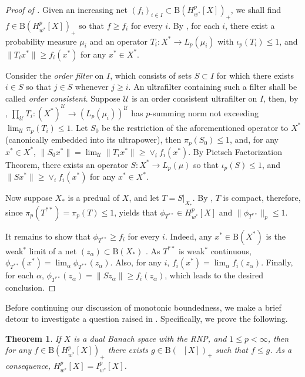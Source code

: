 \documentclass{amsart}
\theoremstyle{plain}
\newtheorem{theorem}{Theorem}[section]
\theoremstyle{definition}
\numberwithin{equation}{section}
\newcommand{\N}{\mathbb{N}}
\newcommand{\ball}{\mathrm{B}}
\DeclareMathOperator{\FBLp}{FBL^{\mathit{(p)}}}
\newcommand{\Hp}{H_{w^*}^{p}}
\newcommand{\nip}{I_{w^*}^{p}}
\begin{document}
\begin{proof}[Proof of ]
Given an increasing net $(f_i)_{i \in I} \subset \ball(\Hp[X])_+$, we shall find $f \in \ball(\Hp[X])_+$ so that $f \geq f_i$ for every $i$.
By , for each $i$, there exist a probability measure $\mu_i$ and an operator $T_i : X^* \to L_p(\mu_i)$ with $\iota_p(T_i) \leq 1$, and $\|T_i x^*\| \geq f_i(x^*)$ for any $x^* \in X^*$.

Consider the \emph{order filter} on $I$, which consists of sets $S \subset I$ for which there exists $i \in S$ so that $j \in S$ whenever $j \geq i$. An ultrafilter containing such a filter shall be called \emph{order consistent}.
Suppose ${\mathcal{U}}$ is an order consistent ultrafilter on $I$, then, by , $\prod_{\mathcal{U}} T_i : (X^*)^{\mathcal{U}} \to (L_p(\mu_i))^{\mathcal{U}}$ has $p$-summing norm not exceeding $\lim_{\mathcal U} \pi_p(T_i) \leq 1$. 
Let $S_0$ be the restriction of the aforementioned operator to $X^*$ (canonically embedded into its ultrapower), then $\pi_p(S_0) \leq 1$, and, for any $x^* \in X^*$, $\|S_0 x^*\| = \lim_{{\mathcal{U}}} \|T_i x^*\| \geq \vee_i f_i(x^*)$. 
By Pietsch Factorization Theorem, there exists an operator $S : X^* \to L_p(\mu)$ so that $\iota_p(S) \leq 1$, and $\|Sx^*\| \geq \vee_i f_i(x^*)$ for any $x^* \in X^*$.

Now suppose $X_*$ is a predual of $X$, and let $T = S|_{X_*}$. By \cite[Theorem II.1]{Car}, $T$ is compact, therefore, since $\pi_p(T^{**}) = \pi_p(T) \leq 1$,  yields that $\phi_{T^{**}} \in \Hp[X]$ and $\|\phi_{T^{**}}\|_p \leq 1$.

It remains to show that $\phi_{T^{**}} \geq f_i$ for every $i$. Indeed, any $x^* \in \ball(X^*)$ is the weak$^*$ limit of a net $(z_\alpha) \subset \ball(X_*)$ . As $T^{**}$ is weak$^*$ continuous, $\phi_{T^{**}}(x^*) = \lim_\alpha \phi_{T^{**}}(z_\alpha)$. Also, for any $i$, $f_i(x^*) = \lim_\alpha f_i(z_\alpha)$. Finally, for each $\alpha$, $\phi_{T^{**}}(z_\alpha) = \|S z_\alpha\| \geq f_i(z_\alpha)$, which leads to the desired conclusion.
\end{proof}

Before continuing our discussion of monotonic boundedness, we make a brief detour to investigate a question raised in \cite{LaTr}. Specifically, we prove the following.

\begin{theorem}\label{la-tr}
 If $X$ is a dual Banach space with the RNP, and $1 \leq p < \infty$, then for any $f \in \ball(\Hp[X])_+$ there exists $g \in \ball(\FBLp[X])_+$ such that $f \leq g$. As a consequence, $\Hp[X] = \nip[X]$.
\end{theorem}
\end{document}
